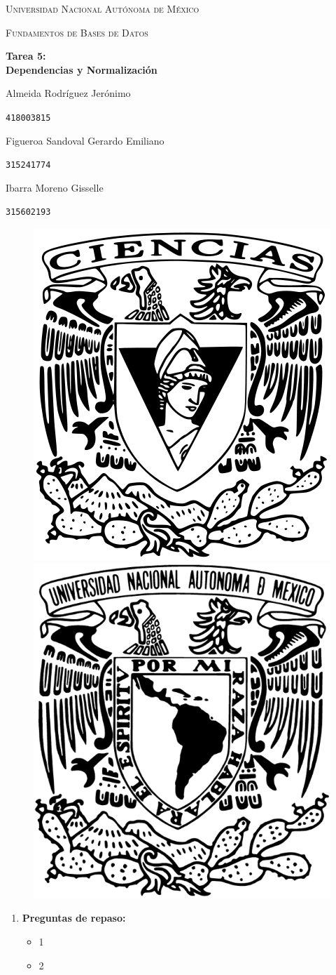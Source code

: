 \documentclass[a4paper, 12pt]{report}
\begin{document}
\begin{titlepage}
    \centering
    {\scshape\Huge Universidad Nacional Autónoma de México \par}
    \vspace{1.25cm}
    {\scshape\huge Fundamentos de Bases de Datos\par}
    \vspace{1.25cm}
    {\huge\bfseries Tarea 5:\\ Dependencias y Normalización\par}
    \vspace{1.25cm}
    {\Large\textsc Almeida Rodríguez Jerónimo\par}
    \vspace{.1cm}
    {\large\texttt{418003815}\par}
    \vspace{0.25cm}
    {\Large\textsc Figueroa Sandoval Gerardo Emiliano\par}
    \vspace{.1cm}
    {\large\texttt{315241774}\par}
    \vspace{0.25cm}
    {\Large\textsc Ibarra Moreno Gisselle \par}
    \vspace{.1cm}
    {\large\texttt{315602193}\par}
    \vspace{1.5cm}
    \vfill
    \begin{figure}[hb!]
        \includegraphics[width=.3\textwidth]
            {../logos/escudo_f-ciencias.png}\hfill
        \includegraphics[width=.3\textwidth]
            {../logos/Escudo_UNAM.png}\hfill
    \end{figure}
\end{titlepage}

\begin{enumerate}
\item{
    \textbf{Preguntas de repaso:}
    \begin{itemize}
        \item 1
        \item 2
    \end{itemize}
}
\end{enumerate}
\end{document}
